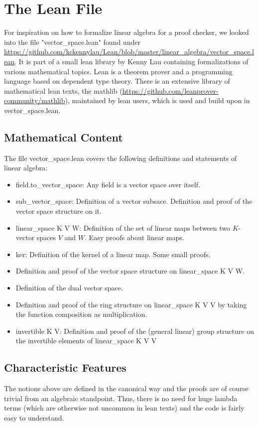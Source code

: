 \documentclass[11pt]{article}
\begin{document}
\newpage
\lstset{style=lean}
\section{The Lean File}
For inspiration on how to formalize linear algebra for a proof checker, we looked into the file "vector\_space.lean" found under \url{https://github.com/kckennylau/Lean/blob/master/linear_algebra/vector_space.lean}. It is part of a small lean library by Kenny Lau containing formalizations of various mathematical topics. Lean is a theorem prover and a programming language based on dependent type theory. There is an extensive library of mathematical lean texts, the mathlib (\url{https://github.com/leanprover-community/mathlib}), maintained by lean users, which is used and build upon in vector\_space.lean.



\subsection{Mathematical Content} \label{mathematicalContent}
The file vector\_space.lean covers the following definitions and statements of linear algebra:
\begin{itemize}
\item {\lean field.to\_vector\_space}: Any field is a vector space over itself.
\item {\lean sub\_vector\_space}: Definition of a vector subsace. Definition and proof of the vector space structure on it.
\item {\lean linear\_space K V W}: Definition of the set of linear maps between two $K$-vector spaces $V$ and $W$. Easy proofs about linear maps.
\item {\lean ker}: Definition of the kernel of a linear map. Some small proofs.
\item Definition and proof of the vector space structure on {\lean linear\_space K V W}.
\item Definition of the dual vector space.
\item Definition and proof of the ring structure on {\lean linear\_space K V V} by taking the function composition as multiplication.
\item {\lean invertible K V}: Definition and proof of the (general linear) group structure on the invertible elements of {\lean linear\_space K V V}
\end{itemize}


%
\subsection{Characteristic Features} \label{characteristics}
The notions above are defined in the canonical way and the proofs are of course trivial from an algebraic standpoint. Thus, there is no need for huge lambda terms (which are otherwise not uncommon in lean texts) and the code is fairly easy to understand.
\end{document}

